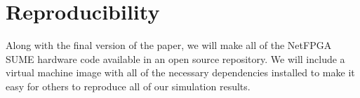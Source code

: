\section{Reproducibility}

Along with the final version of the paper, we will make all of the NetFPGA SUME hardware code available in an open source repository. We will include a virtual machine image with all of the necessary dependencies installed to make it easy for others to reproduce all of our simulation results.